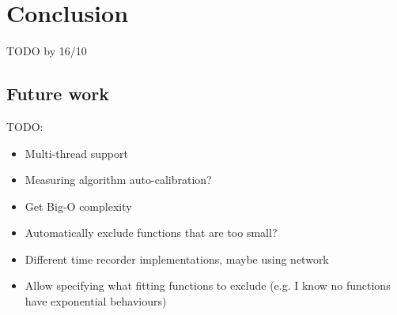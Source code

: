 \chapter{Conclusion}
TODO by 16/10

\section{Future work}
TODO:
\begin{itemize}
  \item Multi-thread support
  \item Measuring algorithm auto-calibration?
  \item Get Big-O complexity
  \item Automatically exclude functions that are too small?
  \item Different time recorder implementations, maybe using network
  \item Allow specifying what fitting functions to exclude (e.g. I know no functions have exponential behaviours)
\end{itemize}
